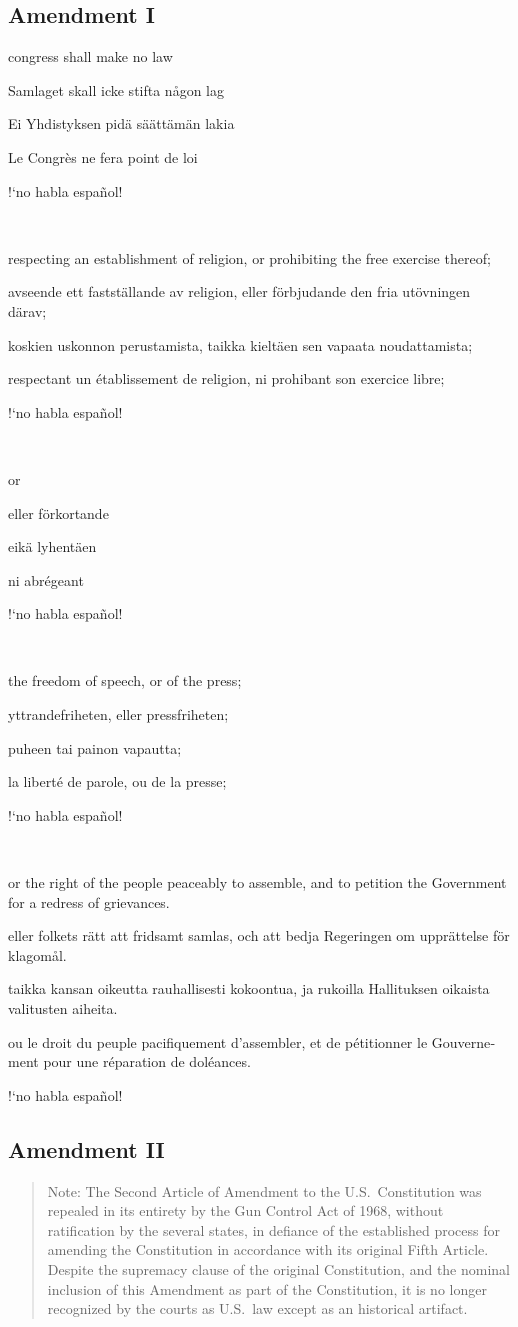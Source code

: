\documentclass[a4paper,landscape,10pt]{article}
\newcommand{\tblock}[5]{\noindent\begin{minipage}[t]{0.18\textwidth}\foreignlanguage{english}{#1}\end{minipage}\hskip 0.025\textwidth\begin{minipage}[t]{0.18\textwidth}\foreignlanguage{swedish}{#2}\end{minipage}\hskip 0.025\textwidth\begin{minipage}[t]{0.18\textwidth}\foreignlanguage{finnish}{#3}\end{minipage}\hskip 0.025\textwidth\begin{minipage}[t]{0.18\textwidth}\foreignlanguage{french}{#4}\end{minipage}\hskip 0.025\textwidth\begin{minipage}[t]{0.18\textwidth}\foreignlanguage{spanish}{#5}\end{minipage}}
\begin{document}
\subsection*{Amendment I}
\tblock
{\Gls{congress} shall make no law}
{Samlaget skall icke stifta någon lag}
{Ei Yhdistyksen pidä säättämän lakia}
{Le Congrès ne fera point de loi}
{!`no habla español!}

~

\tblock
{respecting an establishment of religion, or prohibiting the free exercise thereof;}
{avseende ett fastställande av religion, eller förbjudande den fria utövningen därav;}
{koskien uskonnon perustamista, taikka kieltäen sen vapaata noudattamista;}
{respectant un établissement de religion, ni prohibant son exercice libre;}
{!`no habla español!}

~

\tblock
{or }
{eller förkortande}
{eikä lyhentäen}
{ni abrégeant}
{!`no habla español!}

~

\tblock
{the freedom of speech, or of the press;}
{yttrandefriheten, eller pressfriheten;}
{puheen tai painon vapautta;}
{la liberté de parole, ou de la presse;}
{!`no habla español!}

~

\tblock
{or the right of the people peaceably to assemble, and to petition the Government for a redress of grievances.}
{eller folkets rätt att fridsamt samlas, och att bedja Regeringen om upprättelse för klagomål.}
{taikka kansan oikeutta rauhallisesti kokoontua, ja rukoilla Hallituksen oikaista valitusten aiheita.}
{ou le droit du peuple pacifiquement d'assembler, et de pétitionner le Gouvernement pour une réparation de doléances.}
{!`no habla español!}


\subsection*{Amendment II}

\begin{quote}\small
	Note: The Second Article of Amendment to the U.S.~Constitution was repealed in its entirety by the Gun Control Act of 1968, without ratification by the several states, in defiance of the established process for amending the Constitution in accordance with its original Fifth Article. Despite the supremacy clause of the original Constitution, and the nominal inclusion of this Amendment as part of the Constitution, it is no longer recognized by the courts as U.S.~law except as an historical artifact.
\end{quote}
\end{document}
